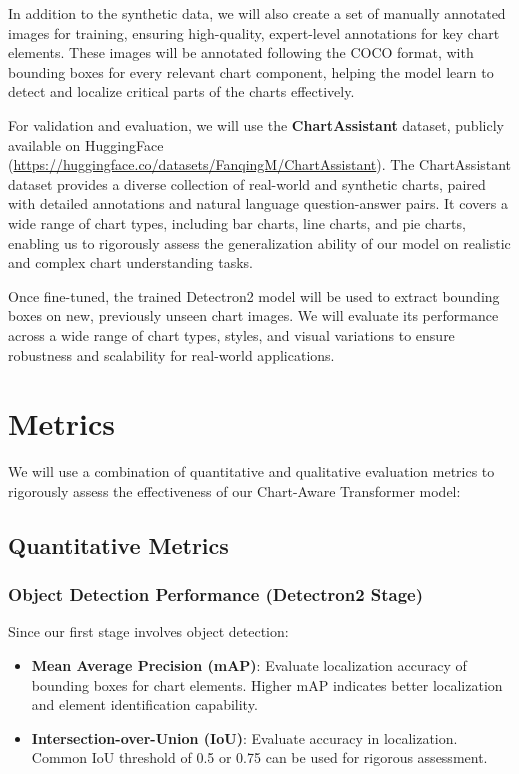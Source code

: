 \documentclass[11pt]{article}
\begin{document}
In addition to the synthetic data, we will also create a set of manually annotated images for training, ensuring high-quality, expert-level annotations for key chart elements. These images will be annotated following the COCO format, with bounding boxes for every relevant chart component, helping the model learn to detect and localize critical parts of the charts effectively.

For validation and evaluation, we will use the \textbf{ChartAssistant} dataset, publicly available on HuggingFace (\url{https://huggingface.co/datasets/FanqingM/ChartAssistant}). The ChartAssistant dataset provides a diverse collection of real-world and synthetic charts, paired with detailed annotations and natural language question-answer pairs. It covers a wide range of chart types, including bar charts, line charts, and pie charts, enabling us to rigorously assess the generalization ability of our model on realistic and complex chart understanding tasks.

Once fine-tuned, the trained Detectron2 model will be used to extract bounding boxes on new, previously unseen chart images. We will evaluate its performance across a wide range of chart types, styles, and visual variations to ensure robustness and scalability for real-world applications.


\section{Metrics} 
We will use a combination of quantitative and qualitative evaluation metrics to rigorously assess the effectiveness of our Chart-Aware Transformer model:

\subsection{Quantitative Metrics}

\subsubsection{Object Detection Performance (Detectron2 Stage)}

Since our first stage involves object detection:

\begin{itemize}
    \item \textbf{Mean Average Precision (mAP)}: Evaluate localization accuracy of bounding boxes for chart elements. Higher mAP indicates better localization and element identification capability.
    \item \textbf{Intersection-over-Union (IoU)}: Evaluate accuracy in localization. Common IoU threshold of 0.5 or 0.75 can be used for rigorous assessment.
\end{itemize}
\end{document}
